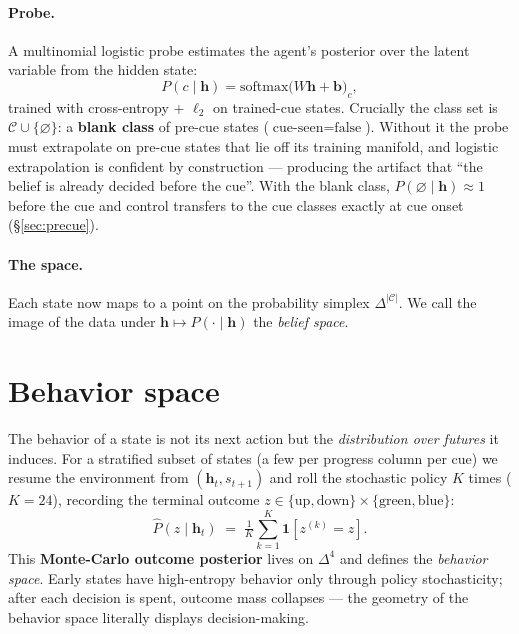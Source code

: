 \documentclass[11pt]{article}
\newcommand{\h}{\bm{h}}
\begin{document}
\paragraph{Probe.} A multinomial logistic probe estimates the agent's posterior
over the latent variable from the hidden state:
\begin{equation}
  P(c \mid \h) = \mathrm{softmax}\!\big(W\h + \bm b\big)_c ,
\end{equation}
trained with cross-entropy + $\ell_2$ on trained-cue states. Crucially the
class set is $\mathcal{C} \cup \{\varnothing\}$: a \textbf{blank class} of
pre-cue states ($\text{cue-seen}=\text{false}$). Without it the probe must
extrapolate on pre-cue states that lie off its training manifold, and logistic
extrapolation is confident by construction --- producing the artifact that
``the belief is already decided before the cue''. With the blank class,
$P(\varnothing\mid\h)\!\approx\!1$ before the cue and control transfers to the
cue classes exactly at cue onset (\S\ref{sec:precue}).

\paragraph{The space.} Each state now maps to a point on the probability
simplex $\Delta^{|\mathcal C|}$. We call the image of the data under
$\h \mapsto P(\cdot\mid\h)$ the \emph{belief space}.

\section{Behavior space}

The behavior of a state is not its next action but the \emph{distribution over
futures} it induces. For a stratified subset of states (a few per progress
column per cue) we resume the environment from $(\h_t, s_{t+1})$ and roll the
stochastic policy $K$ times ($K{=}24$), recording the terminal outcome
$z \in \{\text{up},\text{down}\}\times\{\text{green},\text{blue}\}$:
\begin{equation}
  \widehat{P}(z \mid \h_t)
  \;=\; \tfrac1K \textstyle\sum_{k=1}^K \mathbf 1\!\left[z^{(k)} = z\right].
\end{equation}
This \textbf{Monte-Carlo outcome posterior} lives on $\Delta^{4}$ and defines
the \emph{behavior space}. Early states have high-entropy behavior only through
policy stochasticity; after each decision is spent, outcome mass collapses ---
the geometry of the behavior space literally displays decision-making.
\end{document}
